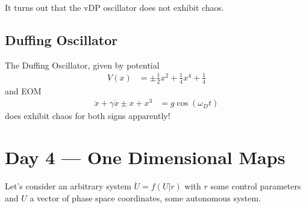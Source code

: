 \documentclass[10pt]{article}
\begin{document}
It turns out that the vDP oscillator does not exhibit chaos.

\subsection{Duffing Oscillator}

The Duffing Oscillator, given by potential
\begin{align}
    V(x) &= \pm \frac{1}{2}x^2 + \frac{1}{4}x^4 + \frac{1}{4}
\end{align}
and EOM
\begin{align}
    \ddot{x} + \gamma \dot{x} \pm x + x^3 &= g\cos(\omega_D t)
\end{align}
does exhibit chaos for both signs apparently!

\section{Day 4 --- One Dimensional Maps}

Let's consider an arbitrary system $\dot{U} = f(U|r)$ with $r$ some control parameters and $U$ a vector of phase space coordinates, some autonomous system.
\end{document}
